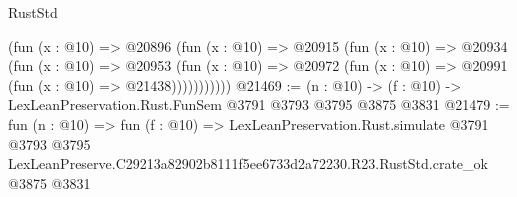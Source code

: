 \begin{lexlean}{RustStd}
\begin{coremodule}
            (fun (x : @10) =>
            @20896
              (fun (x : @10) =>
              @20915
                (fun (x : @10) =>
                @20934
                  (fun (x : @10) =>
                  @20953
                    (fun (x : @10) =>
                    @20972 (fun (x : @10) => @20991 (fun (x : @10) => @21438)))))))))))
@21469 := (n : @10) -> (f : @10) -> LexLeanPreservation.Rust.FunSem @3791 @3793 @3795 @3875 @3831
@21479 := fun (n : @10) =>
  fun (f : @10) =>
  LexLeanPreservation.Rust.simulate
    @3791
    @3793
    @3795
    LexLeanPreserve.C29213a82902b8111f5ee6733d2a72230.R23.RustStd.crate_ok
    @3875
    @3831
\end{coremodule}
\end{lexlean}
